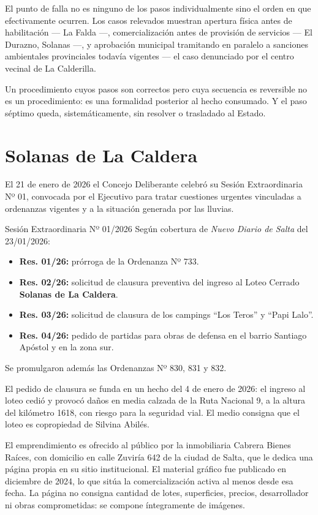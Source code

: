 El punto de falla no es ninguno de los pasos individualmente sino el orden en que efectivamente ocurren. Los casos relevados muestran apertura física antes de habilitación --- La Falda ---, comercialización antes de provisión de servicios --- El Durazno, Solanas ---, y aprobación municipal tramitando en paralelo a sanciones ambientales provinciales todavía vigentes --- el caso denunciado por el centro vecinal de La Calderilla.

Un procedimiento cuyos pasos son correctos pero cuya secuencia es reversible no es un procedimiento: es una formalidad posterior al hecho consumado. Y el paso séptimo queda, sistemáticamente, sin resolver o trasladado al Estado.

\section{Solanas de La Caldera}

El 21 de enero de 2026 el Concejo Deliberante celebró su Sesión Extraordinaria Nº 01, convocada por el Ejecutivo para tratar cuestiones urgentes vinculadas a ordenanzas vigentes y a la situación generada por las lluvias.

\begin{ficha}{Sesión Extraordinaria Nº 01/2026}
Según cobertura de \textit{Nuevo Diario de Salta} del 23/01/2026:
\begin{itemize}[leftmargin=*,nosep]
\item \textbf{Res. 01/26:} prórroga de la Ordenanza Nº 733.
\item \textbf{Res. 02/26:} solicitud de clausura preventiva del ingreso al Loteo Cerrado \textbf{Solanas de La Caldera}.
\item \textbf{Res. 03/26:} solicitud de clausura de los campings ``Los Teros'' y ``Papi Lalo''.
\item \textbf{Res. 04/26:} pedido de partidas para obras de defensa en el barrio Santiago Apóstol y en la zona sur.
\end{itemize}
Se promulgaron además las Ordenanzas Nº 830, 831 y 832.
\end{ficha}

El pedido de clausura se funda en un hecho del 4 de enero de 2026: el ingreso al loteo cedió y provocó daños en media calzada de la Ruta Nacional 9, a la altura del kilómetro 1618, con riesgo para la seguridad vial. El medio consigna que el loteo es copropiedad de Silvina Abilés.

El emprendimiento es ofrecido al público por la inmobiliaria Cabrera Bienes Raíces, con domicilio en calle Zuviría 642 de la ciudad de Salta, que le dedica una página propia en su sitio institucional. El material gráfico fue publicado en diciembre de 2024, lo que sitúa la comercialización activa al menos desde esa fecha. La página no consigna cantidad de lotes, superficies, precios, desarrollador ni obras comprometidas: se compone íntegramente de imágenes.

